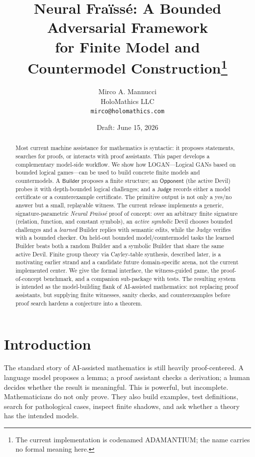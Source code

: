 \documentclass[11pt]{article}
\title{\LOGAN{} Neural Fra\"iss\'e: A Bounded Adversarial Framework\\
\large for Finite Model and Countermodel Construction\footnote{The current implementation is codenamed ADAMANTIUM; the name carries no formal meaning here.}}
\author{Mirco A. Mannucci\\HoloMathics LLC\\\texttt{mirco@holomathics.com}}
\date{Draft: June 15, 2026}
\newcommand{\LOGAN}{\textsc{LOGAN}}
\newcommand{\Builder}{\ensuremath{\mathsf{Builder}}}
\newcommand{\Opponent}{\ensuremath{\mathsf{Opponent}}}
\newcommand{\Judge}{\ensuremath{\mathsf{Judge}}}
\begin{document}
\maketitle

\begin{abstract}
Most current machine assistance for mathematics is syntactic: it proposes statements, searches for proofs, or interacts with proof assistants.  This paper develops a complementary model-side workflow.  We show how \LOGAN{}---Logical GANs based on bounded logical games---can be used to build concrete finite models and countermodels.  A \Builder{} proposes a finite structure; an \Opponent{} (the active Devil) probes it with depth-bounded logical challenges; and a \Judge{} records either a model certificate or a counterexample certificate.  The primitive output is not only a yes/no answer but a small, replayable witness.  The current release implements a generic, signature-parametric \emph{Neural Fra\"iss\'e} proof of concept: over an arbitrary finite signature (relation, function, and constant symbols), an \emph{active symbolic} Devil chooses bounded challenges and a \emph{learned} Builder replies with semantic edits, while the Judge verifies with a bounded checker.  On held-out bounded model/countermodel tasks the learned Builder beats both a random Builder and a symbolic Builder that share the same active Devil.  Finite group theory via Cayley-table synthesis, described later, is a motivating earlier strand and a candidate future domain-specific arena, not the current implemented center.  We give the formal interface, the witness-guided game, the proof-of-concept benchmark, and a companion sub-package with tests.  The resulting system is intended as the model-building flank of AI-assisted mathematics: not replacing proof assistants, but supplying finite witnesses, sanity checks, and counterexamples before proof search hardens a conjecture into a theorem.
\end{abstract}

\tableofcontents

\section{Introduction}

The standard story of AI-assisted mathematics is still heavily proof-centered.  A language model proposes a lemma; a proof assistant checks a derivation; a human decides whether the result is meaningful.  This is powerful, but incomplete.  Mathematicians do not only prove.  They also build examples, test definitions, search for pathological cases, inspect finite shadows, and ask whether a theory has the intended models.
\end{document}
